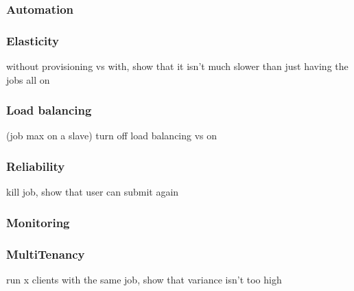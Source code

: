 \subsubsection{Automation}

\subsubsection{Elasticity}

without provisioning vs with, show that it isn't much slower than just having the jobs all on

\subsubsection{Load balancing}

(job max on a slave)
turn off load balancing vs on
\subsubsection{Reliability}

kill job, show that user can submit again
\subsubsection{Monitoring}

\subsubsection{MultiTenancy}
run x clients with the same job, show that variance isn't too high
